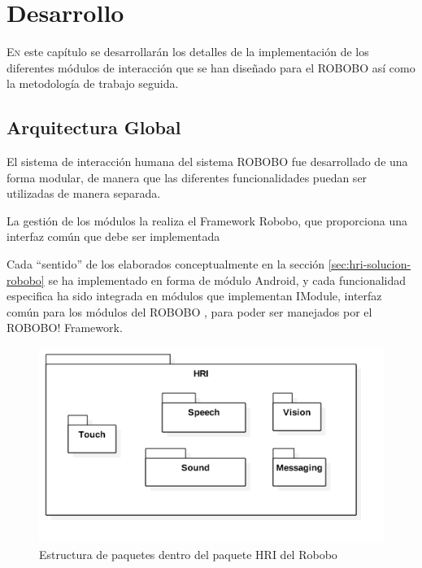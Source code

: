 
\chapter{Desarrollo}
\label{chap:desarrollo}
\vspace{0.5cm}

\lettrine{E}{n} este capítulo se desarrollarán los detalles de la implementación de los diferentes módulos de interacción que se han diseñado para el ROBOBO así como la metodología de trabajo seguida.
\section{Arquitectura Global}
\label{sec:globalArchitecture}
El sistema de interacción humana del sistema ROBOBO fue desarrollado de una forma modular, de manera que las diferentes funcionalidades puedan ser utilizadas de manera separada.

La gestión de los módulos la realiza el Framework Robobo, que proporciona una interfaz común que debe ser implementada


Cada \enquote{sentido} de los elaborados conceptualmente en la sección \ref{sec:hri-solucion-robobo} se ha implementado en forma de módulo Android, y cada funcionalidad especifica ha sido integrada en módulos que implementan IModule, interfaz común para los módulos del ROBOBO , para poder ser manejados por el ROBOBO! Framework\cite{RoboboFramework}.

\begin{figure}
	\centering
	\includegraphics[width=1\linewidth]{imagenes/diagramas/PaquetesGenerales.png}
	\caption{Estructura de paquetes dentro del paquete HRI del Robobo}
	\label{fig:general-package-structure}
\end{figure}

